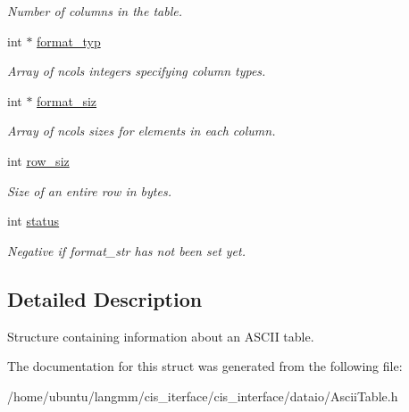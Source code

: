 \begin{DoxyCompactItemize}
\begin{DoxyCompactList}\small\item\em Number of columns in the table. \end{DoxyCompactList}\item 
\mbox{\label{structasciiTable__t_aaa59065a52a15e3dd33c6e043941ed8b}} 
int $\ast$ \hyperlink{structasciiTable__t_aaa59065a52a15e3dd33c6e043941ed8b}{format\+\_\+typ}
\begin{DoxyCompactList}\small\item\em Array of ncols integers specifying column types. \end{DoxyCompactList}\item 
\mbox{\label{structasciiTable__t_a807c3654eee6e0cedc1d8ce1d3e73b17}} 
int $\ast$ \hyperlink{structasciiTable__t_a807c3654eee6e0cedc1d8ce1d3e73b17}{format\+\_\+siz}
\begin{DoxyCompactList}\small\item\em Array of ncols sizes for elements in each column. \end{DoxyCompactList}\item 
\mbox{\label{structasciiTable__t_aaa2f0c09c59e6b4cdad4e3845552da35}} 
int \hyperlink{structasciiTable__t_aaa2f0c09c59e6b4cdad4e3845552da35}{row\+\_\+siz}
\begin{DoxyCompactList}\small\item\em Size of an entire row in bytes. \end{DoxyCompactList}\item 
\mbox{\label{structasciiTable__t_a3a1b4f901f6cad135a0600a22942c43b}} 
int \hyperlink{structasciiTable__t_a3a1b4f901f6cad135a0600a22942c43b}{status}
\begin{DoxyCompactList}\small\item\em Negative if format\+\_\+str has not been set yet. \end{DoxyCompactList}\end{DoxyCompactItemize}


\subsection{Detailed Description}
Structure containing information about an A\+S\+C\+II table. 

The documentation for this struct was generated from the following file\+:\begin{DoxyCompactItemize}
\item 
/home/ubuntu/langmm/cis\+\_\+iterface/cis\+\_\+interface/dataio/Ascii\+Table.\+h\end{DoxyCompactItemize}
